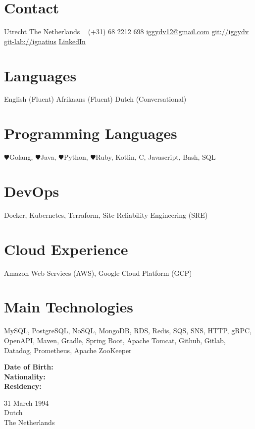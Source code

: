 \documentclass[]{friggeri-cv} %
\begin{document}
\begin{aside} %
\section{Contact}
Utrecht
The Netherlands
~
(+31) 68 2212 698
\href{iggydv12@gmail.com}{iggydv12@gmail.com}
\href{https://github.com/iggydv}{git://iggydv} \faGithub
\href{https://gitlab.com/users/iggydv12/projects}{git-lab://ignatius} \faGitlab
\href{https://www.linkedin.com/in/ignatius-de-villiers-11324b133}{LinkedIn} \faLinkedin
\section{Languages}
English (Fluent)
Afrikaans (Fluent)
Dutch (Conversational)
\section{Programming Languages}
{\color{blue} $\varheartsuit$}Golang, {\color{purple} $\varheartsuit$}Java, {\color{green} $\varheartsuit$}Python, {\color{orange} $\varheartsuit$}Ruby, Kotlin, C, Javascript, Bash, SQL
\section{DevOps}
Docker, Kubernetes, Terraform, Site Reliability Engineering (SRE)
\section{Cloud Experience}
Amazon Web Services (AWS), Google Cloud Platform (GCP) 
\section{Main Technologies}
MySQL, PostgreSQL, NoSQL, MongoDB, RDS, Redis, SQS, SNS, HTTP, gRPC, OpenAPI, Maven, Gradle, Spring Boot, Apache Tomcat, Github, Gitlab, Datadog, Prometheus, Apache ZooKeeper
\end{aside}
\newline
\begin{minipage}[t]{0.2\textwidth}
    \textbf{Date of Birth:}\\
    \textbf{Nationality:}\\
    \textbf{Residency:}\\
\end{minipage}%
%
\begin{minipage}[t]{0.5\textwidth}
    31 March 1994\\
    Dutch\\
    The Netherlands
\end{minipage}%
\newline
\end{document}
